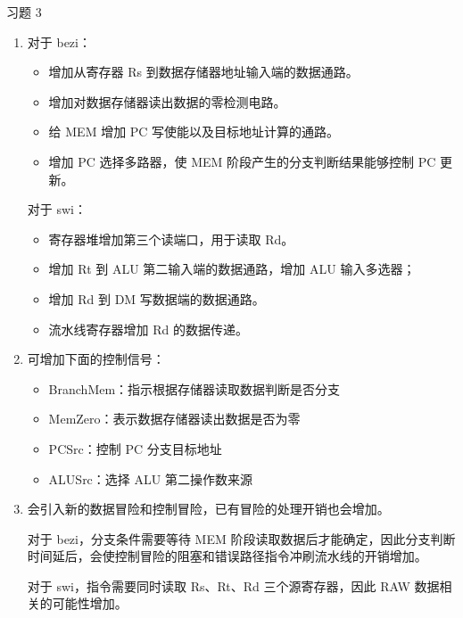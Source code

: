 \begin{problem}
    习题 3
    \begin{solution}
        \begin{enumerate}
            \item[\textbf{1)}] 对于 bezi：
            \begin{itemize}
                \item 增加从寄存器 Rs 到数据存储器地址输入端的数据通路。
                \item 增加对数据存储器读出数据的零检测电路。
                \item 给 MEM 增加 PC 写使能以及目标地址计算的通路。
                \item 增加 PC 选择多路器，使 MEM 阶段产生的分支判断结果能够控制 PC 更新。
            \end{itemize}

            对于 swi：
            \begin{itemize}
                \item 寄存器堆增加第三个读端口，用于读取 Rd。
                \item 增加 Rt 到 ALU 第二输入端的数据通路，增加 ALU 输入多选器；
                \item 增加 Rd 到 DM 写数据端的数据通路。
                \item 流水线寄存器增加 Rd 的数据传递。
            \end{itemize}

            \item[\textbf{2)}] 可增加下面的控制信号：
            \begin{itemize}
                \item BranchMem：指示根据存储器读取数据判断是否分支
                \item MemZero：表示数据存储器读出数据是否为零
                \item PCSrc：控制 PC 分支目标地址
                \item ALUSrc：选择 ALU 第二操作数来源
            \end{itemize}

            \item[\textbf{3)}] 会引入新的数据冒险和控制冒险，已有冒险的处理开销也会增加。

            对于 bezi，分支条件需要等待 MEM 阶段读取数据后才能确定，因此分支判断时间延后，会使控制冒险的阻塞和错误路径指令冲刷流水线的开销增加。

            对于 swi，指令需要同时读取 Rs、Rt、Rd 三个源寄存器，因此 RAW 数据相关的可能性增加。
        \end{enumerate}
    \end{solution}
\end{problem}

